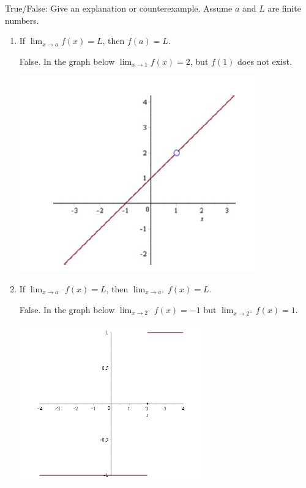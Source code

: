 \documentclass[nooutcomes]{ximera}
\begin{document}
\begin{problem}
True/False:  Give an explanation or counterexample.  Assume $a$ and $L$ are finite numbers.
	
			\begin{enumerate}

			\item  If $ \lim_{x \to a} f(x) = L$, then $f(a) = L$.
			\begin{freeResponse}
			False.  In the graph below $ \lim_{x \to 1} f(x) = 2 $, but $f(1)$ does not exist.
				\begin{image}
				      \includegraphics{Figure1}
				\end{image}
			\end{freeResponse}
			
			\item  If $  \lim_{x \to a^-} f(x) = L$, then $  \lim_{x \to a^+} f(x) = L $.
			\begin{freeResponse}
			False.  In the graph below $ \lim_{x \to 2^-} f(x) = -1$ but $ \lim_{x \to 2^+} f(x) = 1$.
			
				\begin{image}
						      \includegraphics{Figure2}		
				\end{image}
			\end{freeResponse}
			

\end{enumerate}
\end{problem}
\end{document}
